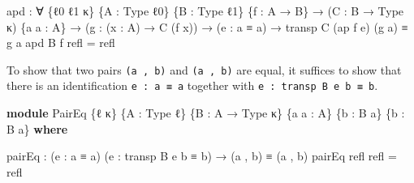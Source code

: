 \documentclass[
  11pt,
  oneside,
  article]{memoir}
\newenvironment{Shaded}{}{}
\newcommand{\KeywordTok}[1]{\textcolor[rgb]{0.00,0.44,0.13}{\textbf{#1}}}
\newcommand{\NormalTok}[1]{#1}
\newcommand{\OtherTok}[1]{\textcolor[rgb]{0.00,0.44,0.13}{#1}}
\theoremstyle{definition}
\theoremstyle{plain}
\newcommand{\0}{\textsf{0}}
\newcommand{\1}{\tn{\textsf{1}}}
\begin{document}
\begin{Shaded}
\begin{Highlighting}[]
\NormalTok{apd }\OtherTok{:} \OtherTok{∀} \OtherTok{\{}\NormalTok{ℓ0 ℓ1 κ}\OtherTok{\}} \OtherTok{\{}\NormalTok{A }\OtherTok{:}\NormalTok{ Type ℓ0}\OtherTok{\}} \OtherTok{\{}\NormalTok{B }\OtherTok{:}\NormalTok{ Type ℓ1}\OtherTok{\}} \OtherTok{\{}\NormalTok{f }\OtherTok{:}\NormalTok{ A }\OtherTok{→}\NormalTok{ B}\OtherTok{\}}
      \OtherTok{→} \OtherTok{(}\NormalTok{C }\OtherTok{:}\NormalTok{ B }\OtherTok{→}\NormalTok{ Type κ}\OtherTok{)} \OtherTok{\{}\NormalTok{a a\textquotesingle{} }\OtherTok{:}\NormalTok{ A}\OtherTok{\}}
      \OtherTok{→} \OtherTok{(}\NormalTok{g }\OtherTok{:} \OtherTok{(}\NormalTok{x }\OtherTok{:}\NormalTok{ A}\OtherTok{)} \OtherTok{→}\NormalTok{ C }\OtherTok{(}\NormalTok{f x}\OtherTok{))} \OtherTok{→} \OtherTok{(}\NormalTok{e }\OtherTok{:}\NormalTok{ a ≡ a\textquotesingle{}}\OtherTok{)} 
      \OtherTok{→}\NormalTok{ transp C }\OtherTok{(}\NormalTok{ap f e}\OtherTok{)} \OtherTok{(}\NormalTok{g a}\OtherTok{)}\NormalTok{ ≡ g a\textquotesingle{}}
\NormalTok{apd B f refl }\OtherTok{=}\NormalTok{ refl}
\end{Highlighting}
\end{Shaded}

To show that two pairs \texttt{(a\ ,\ b)} and
\texttt{(a\textquotesingle{}\ ,\ b\textquotesingle{})} are equal, it
suffices to show that there is an identification
\texttt{e\ :\ a\ ≡\ a\textquotesingle{}} together with
\texttt{e\textquotesingle{}\ :\ transp\ B\ e\ b\ ≡\ b\textquotesingle{}}.

\begin{Shaded}
\begin{Highlighting}[]
\KeywordTok{module}\NormalTok{ PairEq }\OtherTok{\{}\NormalTok{ℓ κ}\OtherTok{\}} \OtherTok{\{}\NormalTok{A }\OtherTok{:}\NormalTok{ Type ℓ}\OtherTok{\}} \OtherTok{\{}\NormalTok{B }\OtherTok{:}\NormalTok{ A }\OtherTok{→}\NormalTok{ Type κ}\OtherTok{\}} 
              \OtherTok{\{}\NormalTok{a a\textquotesingle{} }\OtherTok{:}\NormalTok{ A}\OtherTok{\}} \OtherTok{\{}\NormalTok{b }\OtherTok{:}\NormalTok{ B a}\OtherTok{\}} \OtherTok{\{}\NormalTok{b\textquotesingle{} }\OtherTok{:}\NormalTok{ B a\textquotesingle{}}\OtherTok{\}} \KeywordTok{where}

\NormalTok{    pairEq }\OtherTok{:} \OtherTok{(}\NormalTok{e }\OtherTok{:}\NormalTok{ a ≡ a\textquotesingle{}}\OtherTok{)} \OtherTok{(}\NormalTok{e\textquotesingle{} }\OtherTok{:}\NormalTok{ transp B e b ≡ b\textquotesingle{}}\OtherTok{)} \OtherTok{→} \OtherTok{(}\NormalTok{a , b}\OtherTok{)}\NormalTok{ ≡ }\OtherTok{(}\NormalTok{a\textquotesingle{} , b\textquotesingle{}}\OtherTok{)}
\NormalTok{    pairEq refl refl }\OtherTok{=}\NormalTok{ refl}
\end{Highlighting}
\end{Shaded}
\end{document}
